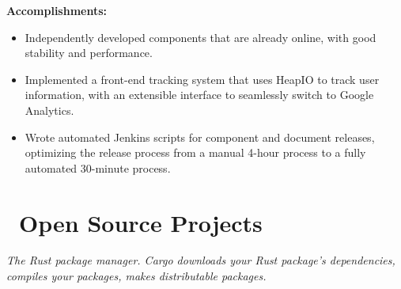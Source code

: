 \documentclass{software_engineer_poe_liu}
\newcommand{\en}[1]{#1}
\newcommand{\zh}[1]{}
\begin{document}
\en{\textbf{Accomplishments:}}
\zh{\textbf{产出：}}
\begin{itemize}
      \item \en{Independently developed components that are already online, with good stability and performance.}
            \zh{多个独立开发的组件已经上线使用，有较好的稳定性和性能。}
      \item \en{Implemented a front-end tracking system that uses HeapIO to track user information, with an extensible interface to seamlessly switch to Google Analytics.}
            \zh{实现了前端的 tracking 系统，使用 HeapIO 追踪用户信息，并预留可扩展接口，可无缝切换至 Google Analytics。}
      \item \en{Wrote automated Jenkins scripts for component and document releases, optimizing the release process from a manual 4-hour process to a fully automated 30-minute process.}
            \zh{为组件和文档发布编写了自动化 Jenkins 脚本，将发布流程从手动 4 小时优化到全自动 30 分钟。}
\end{itemize}

\section{\faGithubAlt\ \en{Open Source Projects}\zh{开源项目}}
\en{}
\zh{\datedsubsection{\textbf{Cargo(Rust) - 维护者}}{{\href{https://github.com/search?q=repo:rust-lang/cargo+repo:rust-lang/rust+author:0xPoe&type=commits}{260+ commits}}}}
\en{\textsl{The Rust package manager. Cargo downloads your Rust package's dependencies, compiles your packages, makes distributable packages.}}
\zh{\textsl{Rust 包管理器，Cargo 下载 Rust 包的依赖，编译包，制作可分发的包。}}
\end{document}
